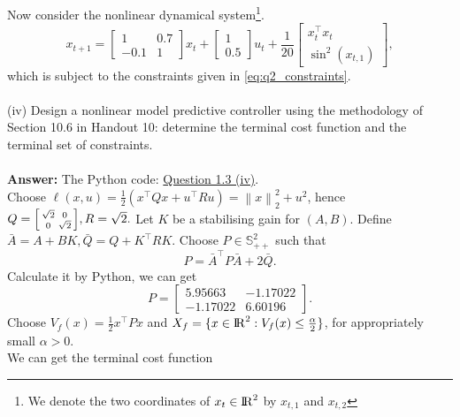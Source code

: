 \documentclass[a4paper,11pt,reqno]{amsart}
\newcommand{\R}{{\rm I\!R}}
\newcommand{\tran}{\intercal}
\begin{document}
Now consider the nonlinear dynamical system\footnote[2]{We denote the two coordinates of $x_t\in\R^2$ by $x_{t,1}$ and $x_{t,2}$}.
\begin{equation}
    x_{t+1}=
    \begin{bmatrix}
        1&0.7\\
        -0.1&1
    \end{bmatrix}
    x_t+
    \begin{bmatrix}
        1\\
        0.5
    \end{bmatrix}
    u_t+
    \frac{1}{20}
    \begin{bmatrix}
        x_t^{\tran}x_t\\
        \sin^2(x_{t,1})
    \end{bmatrix},
\end{equation}
which is subject to the constraints given in \eqref{eq:q2_constraints}.
\\ \\
(iv) Design a nonlinear model predictive controller using the methodology of Section 10.6 in Handout 10: determine the terminal cost function and the terminal set of constraints.
\\ \\
\textbf{Answer:} 
The Python code: \href{https://github.com/Gczmy/ELE8088/blob/main/Coursework1/Python_code/3_iv.py}{Question 1.3 (iv)}.
\\
Choose $\ell(x,u)=\tfrac{1}{2}(x^{\tran}Qx+u^{\tran}Ru)=\left\lVert x\right\rVert ^2_2+u^2$, hence $Q=\begin{bsmallmatrix}\sqrt{2}&0\\0&\sqrt{2}\end{bsmallmatrix},R=\sqrt{2}.$
Let $K$ be a stabilising gain for $(A, B)$. Define $\bar{A} = A + BK, \bar{Q} = Q + K^{\tran}RK$. Choose $P\in\mathbb{S}^2_{++}$ such that
\begin{equation}
    P=\bar{A}^{\tran}P\bar{A}+2\bar{Q}.
\end{equation}
Calculate it by Python, we can get
\begin{equation}
    P=
    \begin{bmatrix}
        5.95663&-1.17022\\
        -1.17022&6.60196
    \end{bmatrix}.
\end{equation}
Choose $V_f(x)=\tfrac{1}{2}x^{\tran}Px$ and $X_f=\{x\in\R^2:V_f(x)\leq\tfrac{\alpha}{2}\}$, for appropriately small $\alpha>0$.
\\
We can get the terminal cost function
\end{document}
